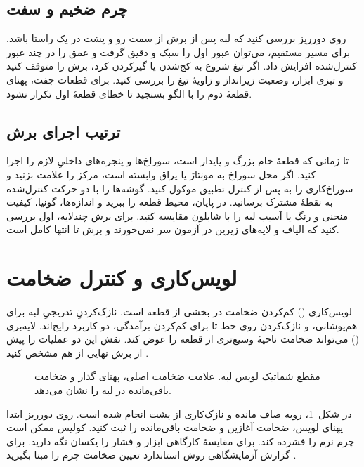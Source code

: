 \subsection{چرم ضخیم و سفت}

روی دورریز بررسی کنید که لبه پس از برش از سمت رو و پشت در یک راستا باشد. برای مسیر مستقیم، می‌توان عبور اول را سبک و دقیق گرفت و عمق را در چند عبور کنترل‌شده افزایش داد. اگر تیغ شروع به کج‌شدن یا گیرکردن کرد، برش را متوقف کنید و تیزی ابزار، وضعیت زیرانداز و زاویۀ تیغ را بررسی کنید. برای قطعات جفت، پهنای قطعۀ دوم را با الگو بسنجید تا خطای قطعۀ اول تکرار نشود.

\subsection{ترتیب اجرای برش}

تا زمانی که قطعۀ خام بزرگ و پایدار است، سوراخ‌ها و پنجره‌های داخلیِ لازم را اجرا کنید. اگر محل سوراخ به مونتاژ یا یراق وابسته است، مرکز را علامت بزنید و سوراخ‌کاری را به پس از کنترل تطبیق موکول کنید. گوشه‌ها را با دو حرکت کنترل‌شده به نقطۀ مشترک برسانید. در پایان، محیط قطعه را ببرید و اندازه‌ها، گونیا، کیفیت منحنی و رنگ یا آسیب لبه را با شابلون مقایسه کنید. برای برش چندلایه، اول بررسی کنید که الیاف و لایه‌های زیرین در آزمون سر نمی‌خورند و برش تا انتها کامل است.

\section{لویس‌کاری و کنترل ضخامت}

لویس‌کاری () کم‌کردن ضخامت در بخشی از قطعه است. نازک‌کردنِ تدریجیِ لبه برای هم‌پوشانی، و نازک‌کردن روی خط تا برای کم‌کردن برآمدگی، دو کاربرد رایج‌اند. لایه‌بری () می‌تواند ضخامت ناحیۀ وسیع‌تری از قطعه را عوض کند. نقش این دو عملیات را پیش از برش نهایی از هم مشخص کنید \cite{sewpro}.

\begin{figure}[!htbp]
  \centering
  \SkiveDiagram
  \caption{مقطع شماتیک لویس لبه. علامت  ضخامت اصلی،  پهنای گذار و  ضخامت باقی‌مانده در لبه را نشان می‌دهد.}
  \label{fig:skive}
\end{figure}

در شکل~\ref{fig:skive}، رویه صاف مانده و نازک‌کاری از پشت انجام شده است. روی دورریز ابتدا پهنای لویس، ضخامت آغازین و ضخامت باقی‌مانده را ثبت کنید. کولیس ممکن است چرم نرم را فشرده کند. برای مقایسۀ کارگاهی ابزار و فشار را یکسان نگه دارید. برای گزارش آزمایشگاهی روش استاندارد تعیین ضخامت چرم را مبنا بگیرید \cite{iso-thickness}.

